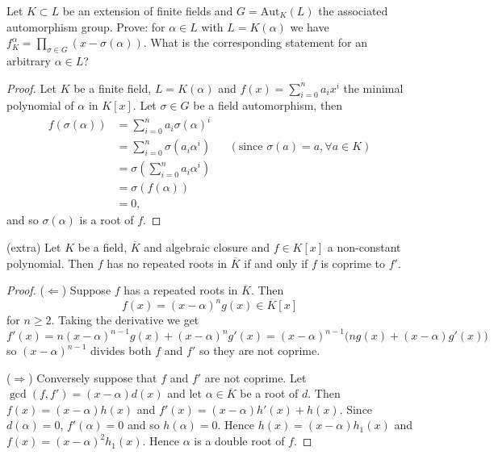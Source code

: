\begin{ex}{22.31}
    Let $K\subset L$ be an extension of finite fields and $G=\text{Aut}_K(L)$ the associated automorphism group.
    Prove: for $\alpha\in L$ with $L=K(\alpha)$ we have $f_K^\alpha = \prod_{\sigma\in G}(x-\sigma(\alpha))$. 
    What is the corresponding statement for an arbitrary $\alpha\in L$? 
\end{ex}
\begin{proof}
    Let $K$ be a finite field, $L=K(\alpha)$ and $f(x)=\sum_{i=0}^n a_i x^i$ the minimal polynomial of $\alpha$ in $K[x]$.
    Let $\sigma\in G$ be a field automorphism, then
    \begin{align*}
        f(\sigma(\alpha))&=\sum_{i=0}^n a_i \sigma(\alpha)^i\\
        &=\sum_{i=0}^n \sigma(a_i\alpha^i)&&(\text{since }\sigma(a)=a, \forall a\in K)\\
        &=\sigma\left(\sum_{i=0}^n a_i \alpha^i\right)\\
        &=\sigma(f(\alpha))\\
        &=0,
    \end{align*}
    and so $\sigma(\alpha)$ is a root of $f$.
\end{proof}

\begin{ex}{(extra)}
    Let $K$ be a field, $\overline{K}$ and algebraic closure and $f\in K[x]$ a non-constant polynomial.
    Then $f$ has no repeated roots in $\overline{K}$ if and only if $f$ is coprime to $f'$.
\end{ex}
\begin{proof}
    ($\Leftarrow$) Suppose $f$ has a repeated roots in $\overline{K}$. 
    Then 
    $$f(x)=(x-\alpha)^n g(x)\in\overline{K}[x]$$
    for $n\geq 2$.
    Taking the derivative we get
    $$f'(x)=n(x-\alpha)^{n-1}g(x)+(x-\alpha)^n g'(x)=(x-\alpha)^{n-1}\big(n g(x)+(x-\alpha)g'(x)\big)$$
    so $(x-\alpha)^{n-1}$ divides both $f$ and $f'$ so they are not coprime.
    
    ($\Rightarrow$) Conversely suppose that $f$ and $f'$ are not coprime. Let $\gcd(f,f')=(x-\alpha)d(x)$
    and let $\alpha\in\overline{K}$ be a root of $d$. Then $f(x)=(x-\alpha)h(x)$ and $f'(x)=(x-\alpha)h'(x)+h(x)$.
    Since $d(\alpha)=0$, $f'(\alpha)=0$ and so $h(\alpha)=0$. 
    Hence $h(x)=(x-\alpha)h_1(x)$ and $f(x)=(x-\alpha)^2 h_1(x)$. Hence $\alpha$ is a double root of $f$.
\end{proof}